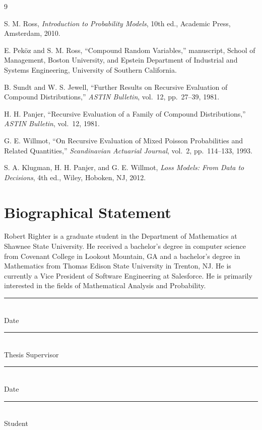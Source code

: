 \documentclass[11pt]{amsart}
\theoremstyle{definition}
\theoremstyle{plain}
\begin{document}
\newpage
\begin{thebibliography}{9}

S. M. Ross, \emph{Introduction to Probability Models}, 10th ed., Academic Press,
Amsterdam, 2010.

E. Pek\"{o}z and S. M. Ross, ``Compound Random Variables,'' manuscript, School of
Management, Boston University, and Epstein Department of Industrial and Systems
Engineering, University of Southern California.


B. Sundt and W. S. Jewell, ``Further Results on Recursive Evaluation of Compound
Distributions,'' \emph{ASTIN Bulletin}, vol.~12, pp.~27--39, 1981.

H. H. Panjer, ``Recursive Evaluation of a Family of Compound Distributions,''
\emph{ASTIN Bulletin}, vol.~12, 1981.

G. E. Willmot, ``On Recursive Evaluation of Mixed Poisson Probabilities and Related
Quantities,'' \emph{Scandinavian Actuarial Journal}, vol.~2, pp.~114--133, 1993.

S. A. Klugman, H. H. Panjer, and G. E. Willmot, \emph{Loss Models: From Data to
Decisions}, 4th ed., Wiley, Hoboken, NJ, 2012.

\end{thebibliography}

\newpage
\section*{Biographical Statement}
Robert Righter is a graduate student in the Department of Mathematics at
Shawnee State University. He received a bachelor's degree in computer science from
Covenant College in Lookout Mountain, GA and a bachelor's degree in Mathematics from Thomas Edison State
University in Trenton, NJ. He is currently a Vice President of Software Engineering at Salesforce.
He is primarily interested in the fields of Mathematical Analysis and Probability.

\vspace{3.5em}
\noindent\begin{minipage}[t]{0.42\textwidth}
\rule{0.95\linewidth}{0.4pt}\\[-0.2em]
Date
\end{minipage}%
\hfill
\begin{minipage}[t]{0.42\textwidth}
\rule{0.95\linewidth}{0.4pt}\\[-0.2em]
Thesis Supervisor
\end{minipage}

\vspace{3.5em}
\noindent\begin{minipage}[t]{0.42\textwidth}
\rule{0.95\linewidth}{0.4pt}\\[-0.2em]
Date
\end{minipage}%
\hfill
\begin{minipage}[t]{0.42\textwidth}
\rule{0.95\linewidth}{0.4pt}\\[-0.2em]
Student
\end{minipage}
\end{document}
